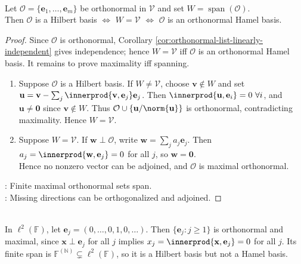 \begin{proposition} \label{prop:finite-hilbert-basis-hamel-basis} \\
Let $\mathcal{O}=\{\mathbf{e}_1,\ldots,\mathbf{e}_m\}$ be orthonormal in $\mathcal{V}$ and set $W=\operatorname{span}(\mathcal{O})$.\\
Then $\mathcal{O}$ is a Hilbert basis $\Longleftrightarrow$ $W=\mathcal{V}$ $\Longleftrightarrow$ $\mathcal{O}$ is an orthonormal Hamel basis.
\begin{proof}
Since $\mathcal{O}$ is orthonormal, Corollary \ref{cor:orthonormal-list-linearly-independent} gives independence; hence $W=\mathcal{V}$ iff $\mathcal{O}$ is an orthonormal Hamel basis. It remains to prove maximality iff spanning.
\begin{enumerate}[label=\roman*.]
\setlength{\itemsep}{0pt}
\item[$(\Rightarrow)$] Suppose $\mathcal{O}$ is a Hilbert basis. If $W\neq\mathcal{V}$, choose $\mathbf{v}\notin W$ and set $\mathbf{u}=\mathbf{v}-\sum_j\innerprod{\mathbf{v},\mathbf{e}_j}\mathbf{e}_j$. Then $\innerprod{\mathbf{u},\mathbf{e}_i}=0 \ \forall i$, and $\mathbf{u}\neq\mathbf{0}$ since $\mathbf{v}\notin W$. Thus $\mathcal{O}\cup\{\mathbf{u}/\norm{\mathbf{u}}\}$ is orthonormal, contradicting maximality. Hence $W=\mathcal{V}$.
\item[$(\Leftarrow)$] Suppose $W=\mathcal{V}$. If $\mathbf{w}\perp\mathcal{O}$, write $\mathbf{w}=\sum_j a_j\mathbf{e}_j$. Then $a_j=\innerprod{\mathbf{w},\mathbf{e}_j}=0$ for all $j$, so $\mathbf{w}=\mathbf{0}$.\\
Hence no nonzero vector can be adjoined, and $\mathcal{O}$ is maximal orthonormal.
\end{enumerate}
: Finite maximal orthonormal sets span.\\
: Missing directions can be orthogonalized and adjoined.
\end{proof}
\end{proposition}

\begin{example} \label{ex:hilbert-basis-not-hamel-basis-l2} \\
In $\ell^2(\mathbb{F})$, let $\mathbf{e}_j=(0,\ldots,0,1,0,\ldots)$. Then $\{\mathbf{e}_j:j\geq1\}$ is orthonormal and maximal, since $\mathbf{x}\perp\mathbf{e}_j$ for all $j$ implies $x_j=\innerprod{\mathbf{x},\mathbf{e}_j}=0$ for all $j$. Its finite span is $\mathbb{F}^{(\mathbb{N})}\subsetneq\ell^2(\mathbb{F})$, so it is a Hilbert basis but not a Hamel basis.
\end{example}

